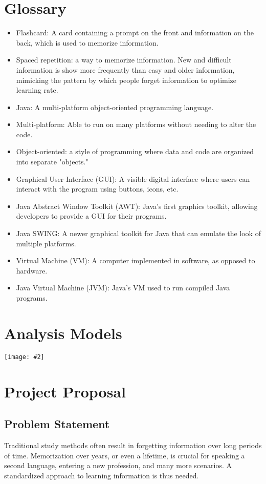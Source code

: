 \documentclass{scrreprt}
\newcommand{\image}[2][1]{
    \begin{center}
        \texttt{[image: \#2]}
    \end{center}
}
\begin{document}
\section{Glossary}
\begin{itemize}
    \item Flashcard: A card containing a prompt on the front and information on the back,
        which is used to memorize information.
    \item Spaced repetition: a way to memorize information. New and difficult information
        is show more frequently than easy and older information, mimicking the pattern
        by which people forget information to optimize learning rate.
    \item Java: A multi-platform object-oriented programming language.
    \item Multi-platform: Able to run on many platforms without needing to alter the code.
    \item Object-oriented: a style of programming where data and code are organized into
        separate "objects."
    \item Graphical User Interface (GUI): A visible digital interface where users can 
        interact with the program using buttons, icons, etc.
    \item Java Abstract Window Toolkit (AWT): Java's first graphics toolkit, allowing developers
        to provide a GUI for their programs.
    \item Java SWING: A newer graphical toolkit for Java that can emulate the look of multiple platforms.
    \item Virtual Machine (VM): A computer implemented in software, as opposed to hardware.
    \item Java Virtual Machine (JVM): Java's VM used to run compiled Java programs.
\end{itemize}

\section{Analysis Models}
\image[0.4]{arion-use-case-diagram}

\section{Project Proposal}

\subsection{Problem Statement}
Traditional study methods often result in forgetting information over long periods of time.
Memorization over years, or even a lifetime, is crucial for
speaking a second language, entering a new profession, and many more scenarios.
A standardized approach to learning information is thus needed.
\end{document}
